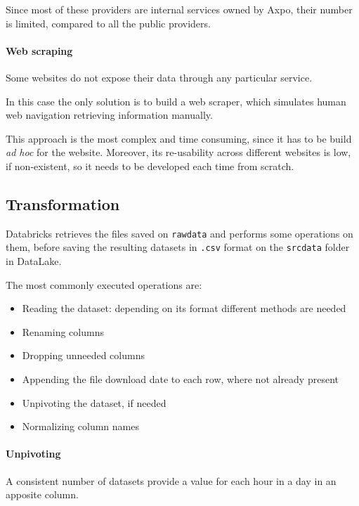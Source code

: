             Since most of these providers are internal services owned by Axpo, their number is limited, compared to all the public providers.
            
        \paragraph{Web scraping}
            Some websites do not expose their data through any particular service.
            
            In this case the only solution is to build a web scraper, which simulates human web navigation retrieving information manually.
            
            This approach is the most complex and time consuming, since it has to be build \textit{ad hoc} for the website.
            Moreover, its re-usability across different websites is low, if non-existent, so it needs to be developed each time from scratch.
        
\subsection{Transformation}
    Databricks retrieves the files saved on \texttt{rawdata} and performs some operations on them, before saving the resulting datasets in \texttt{.csv} format on the \texttt{srcdata} folder in DataLake.
    
    The most commonly executed operations are:
        \begin{itemize}
            \item Reading the dataset: depending on its format different methods are needed
            \item Renaming columns
            \item Dropping unneeded columns
            \item Appending the file download date to each row, where not already present
            \item Unpivoting the dataset, if needed
            \item Normalizing column names
        \end{itemize}
        
    \paragraph{Unpivoting}
        A consistent number of datasets provide a value for each hour in a day in an apposite column.
        
